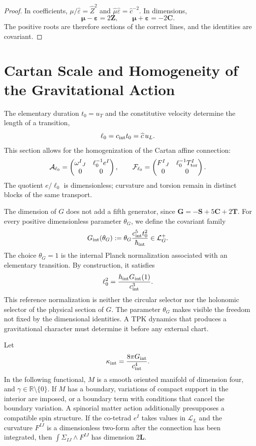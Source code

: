 \begin{proof}
In coefficients,
\(\widehat\mu/\widehat\varepsilon=\widehat Z^2\) and
\(\widehat\mu\widehat\varepsilon=\widehat c^{-2}\). In dimensions,
\[
 \boldsymbol\mu-\boldsymbol\varepsilon=2\mathbf Z,
 \qquad
 \boldsymbol\mu+\boldsymbol\varepsilon=-2\mathbf C.
\]
The positive roots are therefore sections of the correct lines, and the
identities are covariant.
\end{proof}

\section{Cartan Scale and Homogeneity of the Gravitational Action}

The elementary duration \(t_0=u_T\) and the constitutive velocity determine the
length of a transition,
\[
 \ell_0=c_{\rm int}t_0=\widehat c\,u_L.
\]
This section allows for the homogenization of the Cartan affine connection:
\[
 \mathcal A_{\ell_0}
 =\begin{pmatrix}
 \omega^I{}_J&\ell_0^{-1}e^I\\
 0&0
 \end{pmatrix},
 \qquad
 \mathcal F_{\ell_0}
 =\begin{pmatrix}
 F^I{}_J&\ell_0^{-1}T_{\rm tor}^I\\
 0&0
 \end{pmatrix}.
\]
The quotient \(e/\ell_0\) is dimensionless; curvature and torsion remain in
distinct blocks of the same transport.

The dimension of \(G\) does not add a fifth generator, since
\(\mathbf G=-\mathbf S+5\mathbf C+2\mathbf T\). For every positive
dimensionless parameter \(\theta_G\), we define the covariant family
\begin{equation}
 G_{\rm int}(\theta_G)
 :=\theta_G\frac{c_{\rm int}^{5}t_0^2}{\hbar_{\rm int}}
 \in\mathcal L_G^+.
 \label{eq:G-interno}
\end{equation}
The choice \(\theta_G=1\) is the internal Planck normalization associated with
an elementary transition. By construction, it satisfies
\[
 \ell_0^2=\frac{\hbar_{\rm int}G_{\rm int}(1)}
 {c_{\rm int}^{3}}.
\]
This reference normalization is neither the circular selector nor the
holonomic selector of the physical section of \(G\).
The parameter \(\theta_G\) makes visible the freedom not fixed by the
dimensional identities. A TPK dynamics that produces a gravitational
character must determine it before any external chart.

Let
\[
 \kappa_{\rm int}=\frac{8\pi G_{\rm int}}{c_{\rm int}^{4}}.
\]
In the following functional, \(M\) is a smooth oriented manifold of
dimension four, and \(\gamma\in\mathbb R\setminus\{0\}\). If \(M\) has a
boundary, variations of compact support in the interior are imposed, or a
boundary term with conditions that cancel the boundary variation. A
spinorial matter action additionally presupposes a compatible spin
structure.
If the co-tetrad \(e^I\) takes values in \(\mathcal L_L\) and the curvature
\(F^{IJ}\) is a dimensionless two-form after the connection has been integrated,
then
\(\int\Sigma_{IJ}\wedge F^{IJ}\) has dimension \(2\mathbf L\).

